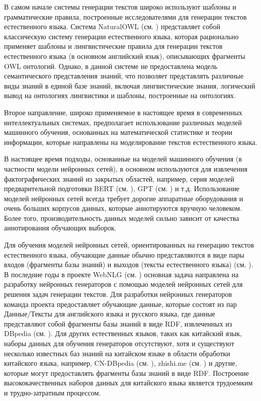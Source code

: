 В самом начале системы генерации текстов широко используют шаблоны и грамматические правила, построенные исследователями для генерации текстов естественного языка. Система NaturalOWL (см. ) представляет собой классическую систему генерации естественного языка, которая рационально применяет шаблоны и лингвистические правила для генерации текстов естественного языка (в основном английский язык), описывающих фрагменты OWL онтологий. Однако, в данной системе не предоставлена модель семантического представления знаний, что позволяет представлять различные виды знаний в единой базе знаний, включая лингвистические знания, логический вывод на онтологиях лингвистики и шаблоны, построенные на онтологиях. 

Второе направление, широко применяемое в настоящее время в современных интеллектуальных системах, предполагает использование различных моделей машинного обучения, основанных на математической статистике и теории информации, которые направлены на моделирование текстов естественного языка.

В настоящее время подходы, основанные на моделей машинного обучения (в частности модели нейронных сетей), в основном используются для извлечения фактографических знаний из закрытых областей, например, серия моделей предварительной подготовки BERT (см. ), GPT (см. ) и т.д. Использование моделей нейронных сетей всегда требует дорогие аппаратные оборудования и очень больших корпусов данных, которые аннотируются вручную человеком. Более того, производительность данных моделей сильно зависит от качества аннотирования обучающих выборок. 

Для обучения моделей нейронных сетей, ориентированных на генерацию текстов естественного языка, обучающие данные обычно представляются в виде пары входов (фрагменты базы знаний) и выходов (тексты естественного языка) (см. ). В последние годы в проекте WebNLG (см. ) основная задача направлена на разработку нейронных генераторов с помощью моделей нейронных сетей для решения задач генерации текстов. Для разработки нейронных генераторов команда проекта предоставляет обучающие данные, которые состоят из пар Данные/Тексты для английского языка и русского языка, где данные представляют собой фрагменты базы знаний в виде RDF, извлеченных из DBpedia (см. ). Для других естественных языков, таких как китайский язык, наборы данных для обучения генераторов отсутствуют, хотя и существуют несколько известных баз знаний на китайском языке в области обработки китайского языка, например, CN-DBpedia (см. ), zhishi.me (см. ) и другие, которые могут предоставлять фрагменты базы знаний в виде RDF. Построение высококачественных наборов данных для китайского языка является трудоемким и трудно-затратным процессом. 

